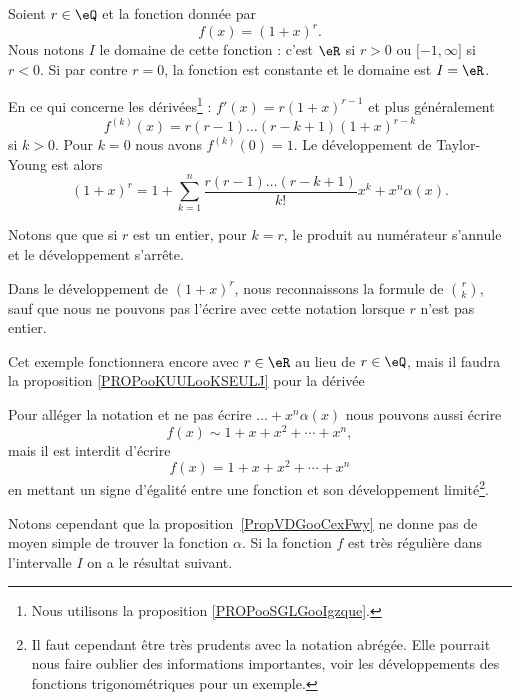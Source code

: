 \begin{example}     \label{EXooFLBJooYfuRsG}
	Soient \( r\in \eQ\) et la fonction donnée par
	\begin{equation}
		f(x)=(1+x)^r.
	\end{equation}
	Nous notons \( I\) le domaine de cette fonction : c'est \( \eR\) si \( r>0\) ou \( \mathopen[ -1 , \infty \mathclose]\) si \( r<0\). Si par contre \( r=0\), la fonction est constante et le domaine est \( I=\eR\).

	En ce qui concerne les dérivées\footnote{Nous utilisons la proposition \ref{PROPooSGLGooIgzque}.} : \( f'(x)=r(1+x)^{r-1}\) et plus généralement
	\begin{equation}
		f^{(k)}(x)=r(r-1)\ldots (r-k+1)(1+x)^{r-k}
	\end{equation}
	si \( k>0\). Pour \( k=0\) nous avons \( f^{(k)}(0)=1\). Le développement de Taylor-Young est alors
	\begin{equation}
		(1+x)^r=1+\sum_{k=1}^n\frac{r(r-1)\ldots (r-k+1)}{ k! }x^k+x^n\alpha(x).
	\end{equation}

	Notons que que si \( r\) est un entier, pour \( k=r\), le produit au numérateur s'annule et le développement s'arrête.

	Dans le développement de \( (1+x)^{r}\), nous reconnaissons la formule de \( \binom{ r }{k}\), sauf que nous ne pouvons pas l'écrire avec cette notation lorsque \( r\) n'est pas entier.
\end{example}
Cet exemple fonctionnera encore avec \( r\in \eR\) au lieu de \( r\in \eQ\), mais il faudra la proposition \ref{PROPooKUULooKSEULJ} pour la dérivée

\begin{remark}
	Pour alléger la notation et ne pas écrire \(\ldots +x^n\alpha(x)\) nous pouvons aussi écrire
	\begin{equation}
		f(x)\sim 1+x+x^2+\cdots +x^n,
	\end{equation}
	mais il est interdit d'écrire
	\begin{equation}
		f(x)= 1+x+x^2+\cdots +x^n
	\end{equation}
	en mettant un signe d'égalité entre une fonction et son développement limité\footnote{Il faut cependant être très prudents avec la notation abrégée. Elle pourrait nous faire oublier des informations importantes, voir les développements des fonctions trigonométriques pour un exemple.}.
\end{remark}

Notons cependant que la proposition~\ref{PropVDGooCexFwy} ne donne pas de moyen simple de trouver la fonction \( \alpha\). Si la fonction \( f\) est très régulière dans l'intervalle \( I\) on a le résultat suivant.


